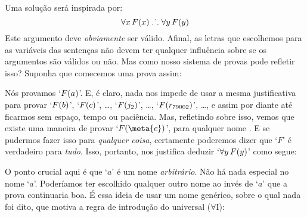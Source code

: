 Uma solução será inspirada por:
$$\forall x\,\mathord{F}(x) \mathrel{\ldotp\dot{}\,\ldotp} \forall y\,\mathord{F}(y)$$
Este argumento deve \emph{obviamente} ser válido. Afinal, as letras que escolhemos para as variáveis das sentenças não devem ter qualquer influência sobre se os argumentos são válidos ou não. Mas como nosso sistema de provas  pode refletir isso? Suponha que comecemos uma prova assim:
\begin{fitchproof}
	 
\end{fitchproof}
  Nós provamos `$\mathord{F}(a)$'. E, é claro, nada nos impede de usar a mesma justificativa para provar `$\mathord{F}(b)$', `$\mathord{F}(c)$', \ldots, `$\mathord{F}(j_2)$', \ldots, `$\mathord{F}(r_{79002})$', \dots, e assim por diante até ficarmos sem espaço, tempo ou paciência. Mas, refletindo sobre isso, vemos que existe uma maneira de provar `$\atom{F}{\meta{c}}$', para qualquer nome . E se pudermos fazer isso para   \emph{qualquer coisa}, certamente poderemos dizer que  `$F$' é verdadeiro para \emph{tudo}. Isso, portanto, nos justifica deduzir `$\forall y\,\mathord{F}(y)$' como segue:
\begin{fitchproof}
	 
	 
\end{fitchproof}
O ponto crucial aqui é que `$a$' é um nome \emph{arbitrário}. Não há nada especial no nome `$a$'. Poderíamos ter escolhido qualquer outro nome ao invés de `$a$' que a prova continuaria boa. É essa ideia de usar um nome genérico, sobre o qual nada foi dito, que motiva a regra de introdução do universal ($\forall$I):


